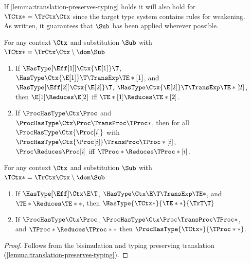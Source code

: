 If \cref{lemma:translation-preserves-typing} holds it will also hold for
$\TCtx*=\TrCtx\Ctx$ since the target type system contains rules for weakening.
As written, it guarantees that $\Sub$ has been applied wherever possible.

\begin{lemma}[Bisimulation]
  \label{lemma:translation-bisimulation}
%
  For any context $\Ctx$ and substitution $\Sub$ with
  $\TCtx*=\TrCtx\Ctx\setminus\dom\Sub$
%
  \begin{enumerate}
    \item If
      $\HasType[\Eff[1]] \Ctx {\E[1]} \T$,
      $\HasType \Ctx {\E[1]} \T \TransExp \TE*[1]$,
      and
      $\HasType[\Eff[2]] \Ctx {\E[2]} \T$,
      $\HasType \Ctx {\E[2]} \T \TransExp \TE*[2]$,
      then
      $\E[1] \Reduces \E[2]$
      iff
      $\TE*[1] \Reduces \TE*[2]$.
    \item If
      $\ProcHasType \Ctx \Proc$
      and
      $\ProcHasType \Ctx \Proc \TransProc \TProc*$,
      then for all
      $\ProcHasType \Ctx {\Proc[i]}$
      with
      $\ProcHasType \Ctx {\Proc[i]} \TransProc \TProc*[i]$,
      $\Proc \Reduces \Proc[i]$
      iff
      $\TProc* \Reduces \TProc*[i]$.
  \end{enumerate}
\end{lemma}

\begin{lemma}
  \label{lemma:translated-subject-reduction}
%
  For any context $\Ctx$ and substitution $\Sub$ with
  $\TCtx*=\TrCtx\Ctx\setminus\dom\Sub$
%
  \begin{enumerate}
    \item If $\HasType[\Eff] \Ctx \E \T$, $\HasType \Ctx \E \T \TransExp \TE*$,
      and $\TE* \Reduces \TE**$, then $\HasType{\TCtx*}{\TE**}{\TrT\T}$
    \item If $\ProcHasType\Ctx\Proc$, $\ProcHasType\Ctx\Proc \TransProc
      \TProc*$, and $\TProc* \Reduces \TProc**$ then
      $\ProcHasType{\TCtx*}{\TProc**}$.
  \end{enumerate}
\end{lemma}
\begin{proof}
  Follows from the bisimulation and typing preserving translation
  (\cref{lemma:translation-preserves-typing}).
\end{proof}
